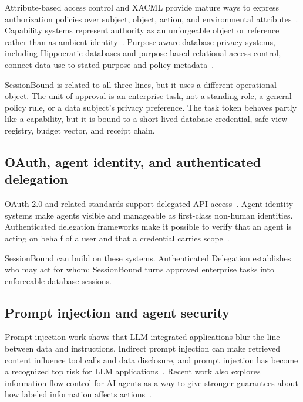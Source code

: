 \documentclass[journal]{IEEEtran}
\begin{document}
Attribute-based access control and XACML provide mature ways to express
authorization policies over subject, object, action, and environmental
attributes~\cite{nist2019abac,oasis2013xacml}. Capability systems
represent authority as an unforgeable object or reference rather than as
ambient identity~\cite{dennis1966programming,miller2003capability}.
Purpose-aware database privacy systems, including Hippocratic databases
and purpose-based relational access control, connect data use to stated
purpose and policy
metadata~\cite{agrawal2002hippocratic,byun2008purpose}.

SessionBound is related to all three lines, but it uses a different
operational object. The unit of approval is an enterprise task, not a
standing role, a general policy rule, or a data subject's privacy
preference. The task token behaves partly like a capability, but it is
bound to a short-lived database credential, safe-view registry, budget
vector, and receipt chain.

\hypertarget{oauth-agent-identity-and-authenticated-delegation}{%
\subsection{OAuth, agent identity, and authenticated
delegation}\label{oauth-agent-identity-and-authenticated-delegation}}

OAuth 2.0 and related standards support delegated API
access~\cite{rfc6749}. Agent identity systems make agents visible and
manageable as first-class non-human identities. Authenticated delegation
frameworks make it possible to verify that an agent is acting on behalf
of a user and that a credential carries
scope~\cite{south2025authenticateddelegation}.

SessionBound can build on these systems. Authenticated Delegation
establishes who may act for whom; SessionBound turns approved enterprise
tasks into enforceable database sessions.

\hypertarget{prompt-injection-and-agent-security}{%
\subsection{Prompt injection and agent
security}\label{prompt-injection-and-agent-security}}

Prompt injection work shows that LLM-integrated applications blur the
line between data and instructions. Indirect prompt injection can make
retrieved content influence tool calls and data disclosure, and prompt
injection has become a recognized top risk for LLM
applications~\cite{greshake2023indirect,liu2023promptinjection,owasp2025llm01}.
Recent work also explores information-flow control for AI agents as a
way to give stronger guarantees about how labeled information affects
actions~\cite{myers1997difc,costa2025ifcagents}.
\end{document}
